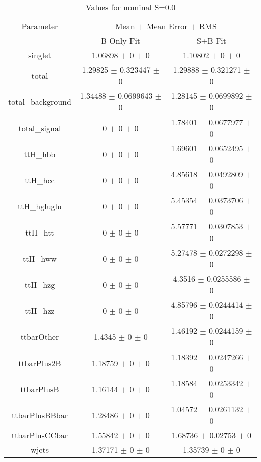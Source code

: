 \begin{table}
\centering
\caption{Values for nominal S=0.0}
\begin{tabular}{ccc}
\toprule
Parameter & \multicolumn{2}{c}{Mean $\pm$ Mean Error $\pm$ RMS}\\
 & B-Only Fit & S+B Fit\\
\midrule
singlet & \num{1.06898} $\pm$ \num{0} $\pm$ \num{0} & \num{1.10802} $\pm$ \num{0} $\pm$ \num{0}\\
total & \num{1.29825} $\pm$ \num{0.323447} $\pm$ \num{0} & \num{1.29888} $\pm$ \num{0.321271} $\pm$ \num{0}\\
total\_background & \num{1.34488} $\pm$ \num{0.0699643} $\pm$ \num{0} & \num{1.28145} $\pm$ \num{0.0699892} $\pm$ \num{0}\\
total\_signal & \num{0} $\pm$ \num{0} $\pm$ \num{0} & \num{1.78401} $\pm$ \num{0.0677977} $\pm$ \num{0}\\
ttH\_hbb & \num{0} $\pm$ \num{0} $\pm$ \num{0} & \num{1.69601} $\pm$ \num{0.0652495} $\pm$ \num{0}\\
ttH\_hcc & \num{0} $\pm$ \num{0} $\pm$ \num{0} & \num{4.85618} $\pm$ \num{0.0492809} $\pm$ \num{0}\\
ttH\_hgluglu & \num{0} $\pm$ \num{0} $\pm$ \num{0} & \num{5.45354} $\pm$ \num{0.0373706} $\pm$ \num{0}\\
ttH\_htt & \num{0} $\pm$ \num{0} $\pm$ \num{0} & \num{5.57771} $\pm$ \num{0.0307853} $\pm$ \num{0}\\
ttH\_hww & \num{0} $\pm$ \num{0} $\pm$ \num{0} & \num{5.27478} $\pm$ \num{0.0272298} $\pm$ \num{0}\\
ttH\_hzg & \num{0} $\pm$ \num{0} $\pm$ \num{0} & \num{4.3516} $\pm$ \num{0.0255586} $\pm$ \num{0}\\
ttH\_hzz & \num{0} $\pm$ \num{0} $\pm$ \num{0} & \num{4.85796} $\pm$ \num{0.0244414} $\pm$ \num{0}\\
ttbarOther & \num{1.4345} $\pm$ \num{0} $\pm$ \num{0} & \num{1.46192} $\pm$ \num{0.0244159} $\pm$ \num{0}\\
ttbarPlus2B & \num{1.18759} $\pm$ \num{0} $\pm$ \num{0} & \num{1.18392} $\pm$ \num{0.0247266} $\pm$ \num{0}\\
ttbarPlusB & \num{1.16144} $\pm$ \num{0} $\pm$ \num{0} & \num{1.18584} $\pm$ \num{0.0253342} $\pm$ \num{0}\\
ttbarPlusBBbar & \num{1.28486} $\pm$ \num{0} $\pm$ \num{0} & \num{1.04572} $\pm$ \num{0.0261132} $\pm$ \num{0}\\
ttbarPlusCCbar & \num{1.55842} $\pm$ \num{0} $\pm$ \num{0} & \num{1.68736} $\pm$ \num{0.02753} $\pm$ \num{0}\\
wjets & \num{1.37171} $\pm$ \num{0} $\pm$ \num{0} & \num{1.35739} $\pm$ \num{0} $\pm$ \num{0}\\
\bottomrule
\end{tabular}
\end{table}